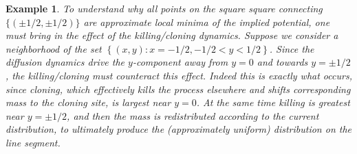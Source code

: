 \documentclass[english,11pt]{article}%
\newtheorem{example}{Example}
\numberwithin{equation}{section}
\numberwithin{example}{section}
\numberwithin{theorem}{section}
\begin{document}
\begin{example}
To understand why all points on the square square connecting $\{(\pm1/2,\pm1/2)\}$ are approximate local minima of the implied potential, 
one must bring in the effect of the
killing/cloning dynamics. Suppose we consider a neighborhood of the set $\left\{
(x,y):x=-1/2,-1/2<y<1/2\right\}  $. 
Since the diffusion dynamics drive the
$y$-component away from $y=0$ and towards $y=\pm1/2$, the killing/cloning must
counteract this effect. Indeed this is exactly what occurs, since cloning,
which effectively kills the process elsewhere and shifts corresponding mass to the cloning site, is largest near
$y=0$. At the same time killing is greatest near $y=\pm1/2$, and then the mass
is redistributed according to the current distribution, to ultimately produce the (approximately uniform)
distribution on the line segment.






\end{example}
\end{document}

